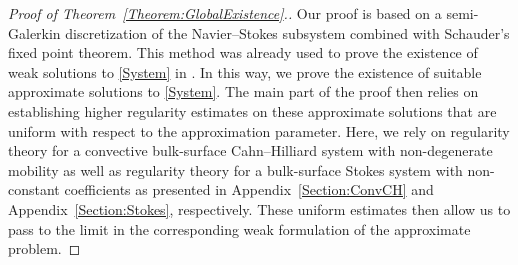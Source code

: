 \documentclass[10pt,reqno]{amsart}
\theoremstyle{remark}
\numberwithin{equation}{section}
\begin{document}
\begin{proof}[Proof of Theorem~\ref{Theorem:GlobalExistence}.]
Our proof is based on a semi-Galerkin discretization of the Navier--Stokes subsystem combined with Schauder's fixed point theorem. This method was already used to prove the existence of weak solutions to \eqref{System} in \cite{Knopf2025a}. In this way, we prove the existence of suitable approximate solutions to \eqref{System}. The main part of the proof then relies on establishing higher regularity estimates on these approximate solutions that are uniform with respect to the approximation parameter. Here, we rely on regularity theory for a convective bulk-surface Cahn--Hilliard system with non-degenerate mobility as well as regularity theory for a bulk-surface Stokes system with non-constant coefficients as presented in Appendix~\ref{Section:ConvCH} and Appendix~\ref{Section:Stokes}, respectively. These uniform estimates then allow us to pass to the limit in the corresponding weak formulation of the approximate problem.


\end{proof}
\end{document}
